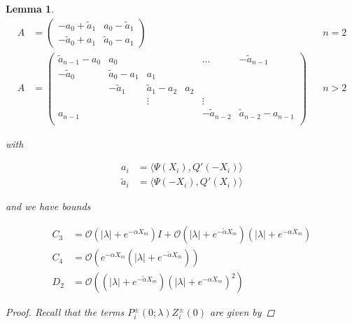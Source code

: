 \documentclass[12pt]{article}
\newtheorem{lemma}{Lemma}
\begin{document}
\begin{lemma}
\begin{align*}
A &= \begin{pmatrix}
-a_0 + \tilde{a}_1 & a_0 - \tilde{a}_1 \\
-\tilde{a}_0 + a_1 & \tilde{a}_0 - a_1
\end{pmatrix} && n = 2 \\
A &= \begin{pmatrix}
\tilde{a}_{n-1} - a_0 & a_0 & & & \dots & -\tilde{a}_{n-1}\\
-\tilde{a}_0 & \tilde{a}_0 - a_1 &  a_1 \\
& -\tilde{a}_1 & \tilde{a}_1 - a_2 &  a_2 \\
& & \vdots & & \vdots \\
a_{n-1} & & & & -\tilde{a}_{n-2} & \tilde{a}_{n-2} - a_{n-1} \\
\end{pmatrix} && n > 2
\end{align*}

with

\begin{align*}
a_i &= \langle \Psi(X_i), Q'(-X_i) \rangle \\
\tilde{a}_i &= \langle \Psi(-X_i), Q'(X_i) \rangle
\end{align*}

and we have bounds

\begin{align*}
C_3 &= \mathcal{O}(|\lambda| + e^{-\alpha X_m}) I
+ \mathcal{O}(|\lambda| + e^{-\tilde{\alpha} X_m})( |\lambda| + e^{-\alpha X_m})\\
C_4 &= \mathcal{O}(e^{-\alpha X_m}(|\lambda| + e^{-\tilde{\alpha} X_m})) \\
D_2 &= \mathcal{O}((|\lambda| + e^{-\tilde{\alpha} X_m})(|\lambda| + e^{-\alpha X_m})^2)
\end{align*}

\begin{proof}

Recall that the terms $P_i^\pm(0; \lambda) Z_i^\pm(0)$ are given by


\end{proof}
\end{lemma}
\end{document}
